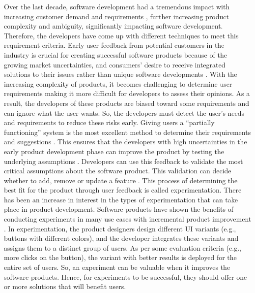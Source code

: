 Over the last decade, software development had a tremendous impact with increasing customer demand and requirements \cite{article:swdemand:ahmed}, further increasing product complexity and ambiguity, significantly impacting software development.  
Therefore, the developers have come up with different techniques to meet this requirement criteria.
Early user feedback from potential customers in the industry is crucial for creating successful software products because of the growing market uncertainties, and consumers' desire to receive integrated solutions to their issues rather than unique software developments \cite{misc:businessmodels:teece}.
With the increasing complexity of products, it becomes challenging to determine user requirements making it more difficult for developers to assess their opinions.
As a result, the developers of these products are biased toward some requirements and can ignore what the user wants. 
So, the developers must detect the user's needs and requirements to reduce these risks early.
Giving users a ``partially functioning'' system is the most excellent method to determine their requirements and suggestions \cite{journal:prototyping:davis}.
This ensures that the developers with high uncertainties in the early product development phase can improve the product by testing the underlying assumptions \cite{misc:lean:steve}.
Developers can use this feedback to validate the most critical assumptions about the software product. 
This validation can decide whether to add, remove or update a feature \cite{article:experiments:lindgren}. 
This process of determining the best fit for the product through user feedback is called experimentation.
There has been an increase in interest in the types of experimentation that can take place in product development. 
Software products have shown the benefits of conducting experiments in many use cases with incremental product improvement \cite{article:controlled:experiements}.
In experimentation, the product designers design different UI variants (e.g., buttons with different colors), and the developer integrates these variants and assigns them to a distinct group of users. 
As per some evaluation criteria (e.g., more clicks on the button), the variant with better results is deployed for the entire set of users.
So, an experiment can be valuable when it improves the software products.
Hence, for experiments to be successful, they should offer one or more solutions that will benefit users.

